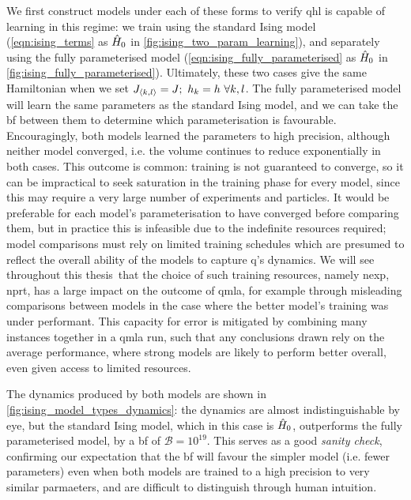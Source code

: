 We first construct models under each of these forms to verify \gls{qhl} is capable of learning in this regime:
    we train using the standard Ising model (\cref{eqn:ising_terms} as $\hat{H}_0$ in \cref{fig:ising_two_param_learning}),
    and separately using the fully parameterised model (\cref{eqn:ising_fully_parameterised} as $\hat{H}_0$ in \cref{fig:ising_fully_parameterised}).
Ultimately, these two cases give the same Hamiltonian when we set $J_{{ \langle k, l \rangle }} = J; \ h_k = h \ \forall k,l$.
The fully parameterised model will learn the same parameters as the standard Ising model,
    and we can take the \gls{bf} between them to determine which parameterisation is favourable.
Encouragingly, both models learned the parameters to high precision, although neither model converged,
    i.e. the \gls{volume} continues to reduce exponentially in both cases.
This outcome is common: training is not guaranteed to converge\footnotemark, 
    so it can be impractical to seek saturation in the training phase for every model, 
    since this may require a very large number of \glspl{experiment} and \glspl{particle}. 
It would be preferable for each model's parameterisation to have converged before comparing them, 
    but in practice this is infeasible due to the indefinite resources required; 
    model comparisons must rely on limited training schedules which are presumed to reflect the overall ability of 
    the models to capture \gls{q}'s dynamics. 
We will see throughout this thesis\footnotemark \ that the choice of such training resources, namely \gls{nexp}, \gls{nprt}, 
    has a large impact on the outcome of \gls{qmla}, for example through misleading comparisons between models 
    in the case where the better model's training was under performant. 
This capacity for error is mitigated by combining many \glspl{instance} together in 
    a \gls{qmla} \gls{run}, such that any conclusions drawn rely on the average performance, 
    where strong models are likely to perform better overall, even given access to limited resources. 
\par 

The dynamics produced by both models are shown in \cref{fig:ising_model_types_dynamics}:
    the dynamics are almost indistinguishable by eye, but the standard Ising model, 
    which in this case is $\hat{H}_0$, outperforms the fully parameterised model, 
    by a \gls{bf} of $\mathcal{B} = 10^{19}$.
This serves as a good \emph{sanity check}, confirming our expectation that 
    the \gls{bf} will favour the simpler model (i.e. fewer parameters) even when both models 
    are trained to a high precision to very similar parmaeters, and are difficult to distinguish through human intuition. 


